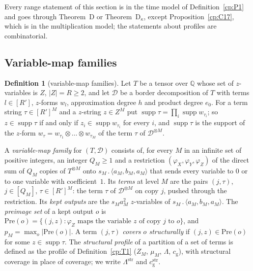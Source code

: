\documentclass[11pt]{article}
\theoremstyle{definition}
\newtheorem{definition}[theorem]{Definition}
\theoremstyle{remark}
\providecommand{\Q}{\mathbb{Q}}
\newcommand{\abs}[1]{\lvert #1\rvert}
\DeclareMathOperator{\supp}{supp}
\newcommand{\mat}[3]{\langle #1,#2,#3\rangle} %
\newcommand{\cp}{\mathbin{.}}                 %
\newcommand{\Lam}{\Lambda}                    %
\newcommand{\cg}{c_{\mathrm g}}               %
\newcommand{\ThmD}{Theorem~D}                               %
\newcommand{\ThmDk}{Theorem~D\texorpdfstring{\ensuremath{_\kappa}}{\_kappa}}     %
\newcommand{\Pre}{\mathrm{Pre}}              %
\begin{document}
Every range statement of this section is in the time model of Definition~\ref{cp:P1} and goes through \ThmD{} or \ThmDk, except Proposition~\ref{cp:C17}, which is in the multiplication model; the statements about profiles are combinatorial.

\subsection{Variable-map families}\label{cp:sec:tr:setting}

\begin{definition}[variable-map families]\label{cp:C1:def}
Let $T$ be a tensor over $\Q$ whose set of $z$-variables is $Z$, $\abs Z=R\ge2$, and let $\mathcal D$ be a border decomposition of $T$ with terms $l\in[R']$, $z$-forms $w_l$, approximation degree $h$ and product degree $e_0$. For a term string $\tau\in[R']^M$ and a $z$-string $z\in Z^M$ put $\supp\tau=\prod_{i}\supp w_{\tau_i}$; so $z\in\supp\tau$ if and only if $z_i\in\supp w_{\tau_i}$ for every $i$, and $\supp\tau$ is the support of the $z$-form $w_\tau=w_{\tau_1}\otimes\dots\otimes w_{\tau_M}$ of the term $\tau$ of $\mathcal D^{\otimes M}$.

A \emph{variable-map family} for $(T,\mathcal D)$ consists of, for every $M$ in an infinite set of positive integers, an integer $Q_M\ge1$ and a restriction $(\varphi_X,\varphi_Y,\varphi_Z)$ of the direct sum of $Q_M$ copies of $T^{\otimes M}$ onto $s_M\cp\mat{a_M}{b_M}{a_M}$ that sends every variable to $0$ or to one variable with coefficient~$1$. Its \emph{terms} at level $M$ are the pairs $(j,\tau)$, $j\in[Q_M]$, $\tau\in[R']^M$: the term $\tau$ of $\mathcal D^{\otimes M}$ on copy $j$, pushed through the restriction. Its \emph{kept outputs} are the $s_Ma_M^2$ $z$-variables of $s_M\cp\mat{a_M}{b_M}{a_M}$. The \emph{preimage set} of a kept output $o$ is $\Pre(o)=\{(j,z):\varphi_Z\text{ maps the variable $z$ of copy $j$ to }o\}$, and $p_M=\max_o\abs{\Pre(o)}$. A term $(j,\tau)$ \emph{covers $o$ structurally} if $(j,z)\in\Pre(o)$ for some $z\in\supp\tau$. The \emph{structural profile} of a partition of a set of terms is defined as the profile of Definition~\ref{cp:T1} ($Z_M$, $\mu_M$, $\Lam$, $\cg$), with structural coverage in place of coverage; we write $\Lam^{\mathrm{str}}$ and $\cg^{\mathrm{str}}$.
\end{definition}
\end{document}
